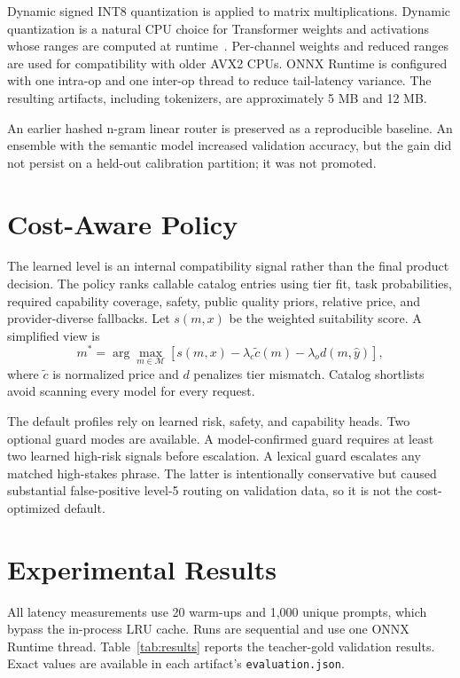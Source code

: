 \documentclass[10pt,twocolumn]{article}
\begin{document}
Dynamic signed INT8 quantization is applied to matrix multiplications. Dynamic
quantization is a natural CPU choice for Transformer weights and activations
whose ranges are computed at runtime~\cite{onnx-quant}. Per-channel weights and
reduced ranges are used for compatibility with older AVX2 CPUs. ONNX Runtime is
configured with one intra-op and one inter-op thread to reduce tail-latency
variance. The resulting artifacts, including tokenizers, are approximately 5 MB
and 12 MB.

An earlier hashed n-gram linear router is preserved as a reproducible baseline.
An ensemble with the semantic model increased validation accuracy, but the gain
did not persist on a held-out calibration partition; it was not promoted.

\section{Cost-Aware Policy}
The learned level is an internal compatibility signal rather than the final
product decision. The policy ranks callable catalog entries using tier fit, task
probabilities, required capability coverage, safety, public quality priors,
relative price, and provider-diverse fallbacks. Let $s(m,x)$ be the weighted
suitability score. A simplified view is
\begin{equation}
 m^*=\arg\max_{m\in\mathcal M}
 \left[s(m,x)-\lambda_c\widetilde c(m)-\lambda_o d(m,\hat y)\right],
\end{equation}
where $\widetilde c$ is normalized price and $d$ penalizes tier mismatch. Catalog
shortlists avoid scanning every model for every request.

The default profiles rely on learned risk, safety, and capability heads. Two
optional guard modes are available. A model-confirmed guard requires at least two
learned high-risk signals before escalation. A lexical guard escalates any
matched high-stakes phrase. The latter is intentionally conservative but caused
substantial false-positive level-5 routing on validation data, so it is not the
cost-optimized default.

\section{Experimental Results}
All latency measurements use 20 warm-ups and 1,000 unique prompts, which bypass
the in-process LRU cache. Runs are sequential and use one ONNX Runtime thread.
Table~\ref{tab:results} reports the teacher-gold validation results. Exact values
are available in each artifact's \texttt{evaluation.json}.
\end{document}
